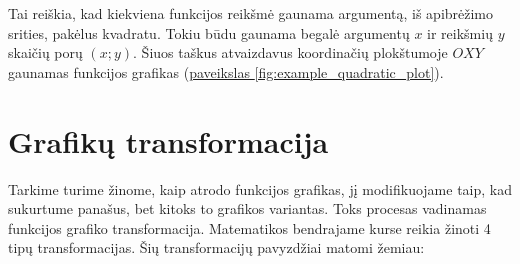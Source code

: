 \documentclass{tufte-handout}
\begin{document}
Tai reiškia, kad kiekviena funkcijos reikšmė gaunama argumentą, iš apibrėžimo
srities, pakėlus kvadratu. Tokiu būdu gaunama begalė argumentų $x$ ir reikšmių
$y$ skaičių porų
$(x; y)$. Šiuos taškus atvaizdavus koordinačių plokštumoje $OXY$ gaunamas
funkcijos grafikas (\hyperref[fig:example_quadratic_plot]{paveikslas
  \ref*{fig:example_quadratic_plot}}).

\section{Grafikų transformacija}\label{sec:graph_transformation}

Tarkime turime žinome, kaip atrodo funkcijos grafikas, jį modifikuojame taip,
kad sukurtume panašus, bet kitoks to grafikos variantas. Toks procesas
vadinamas funkcijos grafiko transformacija. Matematikos bendrajame kurse reikia
žinoti 4 tipų transformacijas. Šių transformacijų pavyzdžiai matomi žemiau:
\end{document}
